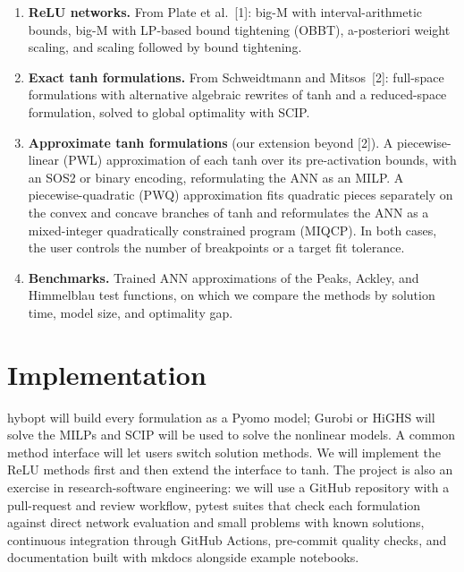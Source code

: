 \documentclass[11pt]{article}
\begin{document}
\begin{enumerate}[label=\alph*),leftmargin=2em,itemsep=0pt,topsep=0pt]
  \item \textbf{ReLU networks.} From Plate et al.~[1]: big-M with interval-arithmetic bounds, big-M with LP-based bound tightening (OBBT),
                                a-posteriori weight scaling, and scaling followed by bound tightening.
  \item \textbf{Exact tanh formulations.} From Schweidtmann and Mitsos~[2]: full-space formulations with alternative algebraic rewrites of tanh
                                          and a reduced-space formulation, solved to global optimality with SCIP.
  \item \textbf{Approximate tanh formulations} (our extension beyond [2]). A piecewise-linear (PWL) approximation of each tanh over its pre-activation bounds,
                                                with an SOS2 or binary encoding, reformulating the ANN as an MILP.
                                                A piecewise-quadratic (PWQ) approximation fits quadratic pieces separately on the convex and concave branches
                                                of tanh and reformulates the ANN as a mixed-integer quadratically constrained program (MIQCP).
                                                In both cases, the user controls the number of breakpoints or a target fit tolerance.
  \item \textbf{Benchmarks.} Trained ANN approximations of the Peaks, Ackley, and Himmelblau test functions, on which we compare the methods by solution time, model size, and optimality gap.
\end{enumerate}

\section{Implementation}

hybopt will build every formulation as a Pyomo model; Gurobi or HiGHS will solve the MILPs and SCIP will be used to solve the nonlinear models.
A common method interface will let users switch solution methods.
We will implement the ReLU methods first and then extend the interface to tanh.
The project is also an exercise in research-software engineering: we will use a GitHub repository with a pull-request and review workflow,
pytest suites that check each formulation against direct network evaluation and small problems with known solutions,
continuous integration through GitHub Actions, pre-commit quality checks, and documentation built with mkdocs alongside example notebooks.
\end{document}

